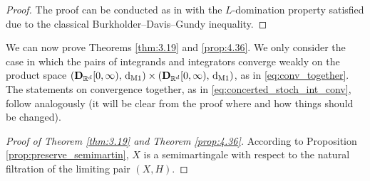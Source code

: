 \documentclass[11pt]{article}
\theoremstyle{definition}\newtheorem{example}[theorem]{Example}
\theoremstyle{definition}\newtheorem{counterexample}[theorem]{Counterexample}
\theoremstyle{definition}\newtheorem{remark}[theorem]{Remark}
\theoremstyle{definition}\newtheorem{defi}[theorem]{Definition}
\numberwithin{equation}{section}
\newcommand{\R}{\mathbb{R}}
\newcommand{\D}{{\bf D}}											%
\newcommand*\diff{\mathop{}\!\mathrm{d}}								%
\renewcommand{\|}{\; : \, \;}											%
\newcommand{\dM}{\diff_{\operatorname{M1}}}							%
\begin{document}
\begin{proof}
	The proof can be conducted as in \cite[Lem.~I.3.30]{shiryaev} with the $L$-domination property satisfied due to the classical Burkholder--Davis--Gundy inequality.
\end{proof}

We can now prove Theorems \ref{thm:3.19} and \ref{prop:4.36}. We only consider the case in which the pairs of integrands and integrators converge weakly on the product space $(\D_{\R^d}[0,\infty), \, \dM)\times (\D_{\R^d}[0,\infty), \, \dM)$, as in \eqref{eq:conv_together}. The statements on convergence together, as in \eqref{eq:concerted_stoch_int_conv}, follow analogously (it will be clear from the proof where and how things should be changed). 

\begin{proof}[Proof of Theorem \ref{thm:3.19} and Theorem \ref{prop:4.36}] 
	According to Proposition \ref{prop:preserve_semimartin}, $X$ is a semimartingale with respect to the natural filtration of the limiting pair $(X,H)$.
	

\end{proof}
\end{document}
